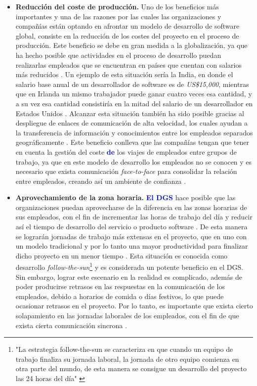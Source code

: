 \begin{itemize}
	\item \textbf{Reducción del coste de producción.} Uno de los beneficios más importantes y una de las razones por las cuales las organizaciones y compañías están optando en afrontar un modelo de desarrollo de software global, consiste en la reducción de los costes del proyecto en el proceso de producción. Este beneficio se debe en gran medida a la globalización, ya que ha hecho posible que actividades en el proceso de desarrollo puedan realizarlas empleados que se encuentran en países que cuentan con salarios más reducidos \cite{aagerfalk2008benefits}. Un ejemplo de esta situación sería la India, en donde el salario base anual de un desarrollador de software es de \emph{US\$15,000}, mientras que en Irlanda un mismo trabajador puede ganar cuatro veces esa cantidad, y a su vez esa cantidad consistiría en la mitad del salario de un desarrollador en Estados Unidos \cite{conchuir2009global, conchuir2006exploring}. Alcanzar esta situación también ha sido posible gracias al despliegue de enlaces de comunicación de alta velocidad, los cuales ayudan a la transferencia de información y conocimientos entre los empleados separados geográficamente \cite{aagerfalk2008benefits}. Este beneficio conlleva que las compañías tengan que tener en cuenta la gestión del coste \textbf{\textcolor{blue}{de}} los viajes de empleados entre grupos de trabajo, ya que en este modelo de desarrollo los empleados no se conocen y es necesario que exista comunicación \emph{face-to-face} para consolidar la relación entre empleados, creando así un ambiente de confianza \cite{conchuir2009global, conchuir2006exploring}.
	
	\item \textbf{Aprovechamiento de la zona horaria.} \textbf{\textcolor{blue}{El DGS}} hace posible que las organizaciones puedan aprovecharse de la diferencia en las zonas horarias de sus empleados, con el fin de incrementar las horas de trabajo del día y reducir así el tiempo de desarrollo del servicio o producto software \cite{conchuir2006exploring, conchuir2009global}. De esta manera se lograrán jornadas de trabajo más extensas en el proyecto, que en uno con un modelo tradicional y por lo tanto una mayor productividad para finalizar dicho proyecto en un menor tiempo \cite{vizcaino2015vision}. Esta situación es conocida como desarrollo \emph{follow-the-sun}\footnote{"La estrategia follow-the-sun se caracteriza en que cuando un equipo de trabajo finaliza su jornada laboral, la jornada de otro equipo comienza en otra parte del mundo, de esta manera se consigue un desarrollo del proyecto las 24 horas del día" \cite{piattini2014desarrollo}} y es considerada un potente beneficio en el DGS. Sin embargo, lograr este escenario en la realidad es complicado, además de poder producirse retrasos en las respuestas en la comunicación de los empleados, debido a horarios de comida o días festivos, lo que puede ocasionar retrasos en el proyecto. Por lo tanto, es importante que exista cierto solapamiento en las jornadas laborales de los empleados, con el fin de que exista cierta comunicación sincrona \cite{conchuir2006exploring, conchuir2009global}.
	

\end{itemize}
